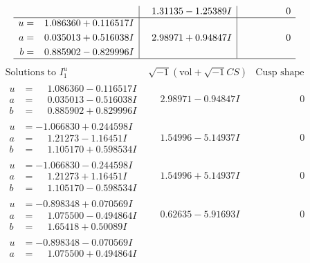 \documentclass[1p]{elsarticle_modified}
\theoremstyle{definition}
\newcommand{\I}{\sqrt{-1}}
\begin{document}
$$\begin{array}{c|c|c}
 & \phantom{-}1.31135 - 1.25389 I & \phantom{-0.000000 } 0 \\ \hline\begin{aligned}
u &= \phantom{-}1.086360 + 0.116517 I \\
a &= \phantom{-}0.035013 + 0.516038 I \\
b &= \phantom{-}0.885902 - 0.829996 I\end{aligned}
 & \phantom{-}2.98971 + 0.94847 I & \phantom{-0.000000 } 0\\
 \hline 
 \end{array}$$\newpage$$\begin{array}{c|c|c}  
\text{Solutions to }I^u_{1}& \I (\text{vol} + \sqrt{-1}CS) & \text{Cusp shape}\\
 \hline 
\begin{aligned}
u &= \phantom{-}1.086360 - 0.116517 I \\
a &= \phantom{-}0.035013 - 0.516038 I \\
b &= \phantom{-}0.885902 + 0.829996 I\end{aligned}
 & \phantom{-}2.98971 - 0.94847 I & \phantom{-0.000000 } 0 \\ \hline\begin{aligned}
u &= -1.066830 + 0.244598 I \\
a &= \phantom{-}1.21273 - 1.16451 I \\
b &= \phantom{-}1.105170 + 0.598534 I\end{aligned}
 & \phantom{-}1.54996 - 5.14937 I & \phantom{-0.000000 } 0 \\ \hline\begin{aligned}
u &= -1.066830 - 0.244598 I \\
a &= \phantom{-}1.21273 + 1.16451 I \\
b &= \phantom{-}1.105170 - 0.598534 I\end{aligned}
 & \phantom{-}1.54996 + 5.14937 I & \phantom{-0.000000 } 0 \\ \hline\begin{aligned}
u &= -0.898348 + 0.070569 I \\
a &= \phantom{-}1.075500 - 0.494864 I \\
b &= \phantom{-}1.65418 + 0.50089 I\end{aligned}
 & \phantom{-}0.62635 - 5.91693 I & \phantom{-0.000000 } 0 \\ \hline\begin{aligned}
u &= -0.898348 - 0.070569 I \\
a &= \phantom{-}1.075500 + 0.494864 I \\

\end{aligned}
\end{array}$$
\end{document}
